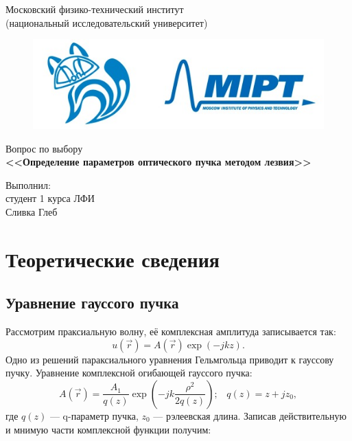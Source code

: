 \documentclass[a4paper,14pt]{extarticle}
\begin{document}
	\begin{titlepage}
		\begin{center}
			\large Московский физико-технический институт\\
			(национальный исследовательский университет)\\
			\vspace{1cm}
			\begin{figure}[h!]
				\centering
				\includegraphics[width=0.7\linewidth]{MIPT.jpeg}
				\label{fig:mpr}
			\end{figure}
			\vspace{3cm}
			\Large Вопрос по выбору \\
			\vspace{4cm}
			\textbf{\Huge <<Определение параметров оптического пучка методом лезвия>>}\\
		\end{center}
		
		\vspace{5cm}
		{\par \raggedleft \large Выполнил:\\ студент 1 курса ЛФИ \\ Сливка Глеб \par}
	\end{titlepage}
	\tableofcontents
	\newpage
	\section{Теоретические сведения}
	
\subsection{Уравнение гауссого пучка}
	
Рассмотрим праксиальную волну, её комплексная амплитуда записывается так: 
\begin{equation}
	u(\vec{r}) = A(\vec{r}) \exp(-jkz).
	\label{u(r)}
\end{equation}
	Одно из решений параксиального уравнения Гельмгольца приводит к гауссову пучку. Уравнение комплексной огибающей гауссого пучка: 
	\begin{equation}
		A(\vec{r}) = \frac{A_1}{q(z)} \exp \left( -jk \frac{\rho^2}{2q(z)} \right); \; \; \; q(z) = z + jz_0,
		\label{A(r)}
	\end{equation}
	где $q(z)$ --- q-параметр пучка, $z_0$ --- рэлеевская длина. Записав действительную и мнимую части комплексной функции получим: 
	
\end{document}
